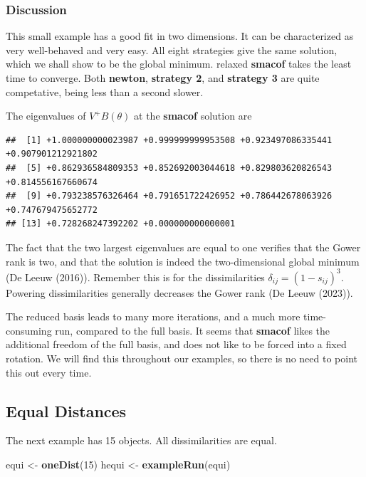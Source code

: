 \documentclass[
  12pt,
]{article}
\newenvironment{Shaded}{\begin{snugshade}}{\end{snugshade}}
\newcommand{\DecValTok}[1]{\textcolor[rgb]{0.00,0.00,0.81}{#1}}
\newcommand{\FunctionTok}[1]{\textcolor[rgb]{0.13,0.29,0.53}{\textbf{#1}}}
\newcommand{\NormalTok}[1]{#1}
\newcommand{\OtherTok}[1]{\textcolor[rgb]{0.56,0.35,0.01}{#1}}
\begin{document}
\subsubsection{Discussion}\label{discussion-1}

This small example has a good fit in two dimensions. It can be characterized as very well-behaved and very easy.
All eight strategies give the same solution, which we shall show to be the global minimum.
relaxed \textbf{smacof} takes the least time to converge. Both \textbf{newton}, \textbf{strategy 2}, and
\textbf{strategy 3} are quite competative, being less than a second slower.

The eigenvalues of \(V^+B(\theta)\) at the \textbf{smacof} solution are

\begin{verbatim}
##  [1] +1.000000000023987 +0.999999999953508 +0.923497086335441 +0.907901212921802
##  [5] +0.862936584809353 +0.852692003044618 +0.829803620826543 +0.814556167660674
##  [9] +0.793238576326464 +0.791651722426952 +0.786442678063926 +0.747679475652772
## [13] +0.728268247392202 +0.000000000000001
\end{verbatim}

The fact that the two largest eigenvalues are equal to one verifies that the Gower rank is two, and that the solution is indeed the two-dimensional global minimum (De Leeuw (2016)). Remember this is for the dissimilarities \(\delta_{ij}=(1-s_{ij})^3\). Powering dissimilarities generally decreases the Gower rank (De Leeuw (2023)).

The reduced basis leads to many more iterations, and a much more time-consuming run, compared to the full
basis. It seems that \textbf{smacof} likes the additional freedom of the full basis, and does not like
to be forced into a fixed rotation. We will find this throughout our examples, so there is no need
to point this out every time.

\subsection{Equal Distances}\label{equal-distances}

The next example has 15 objects. All dissimilarities are equal.

\begin{Shaded}
\begin{Highlighting}[]
\NormalTok{equi }\OtherTok{\textless{}{-}} \FunctionTok{oneDist}\NormalTok{(}\DecValTok{15}\NormalTok{)}
\NormalTok{hequi }\OtherTok{\textless{}{-}} \FunctionTok{exampleRun}\NormalTok{(equi)}
\end{Highlighting}
\end{Shaded}
\end{document}
